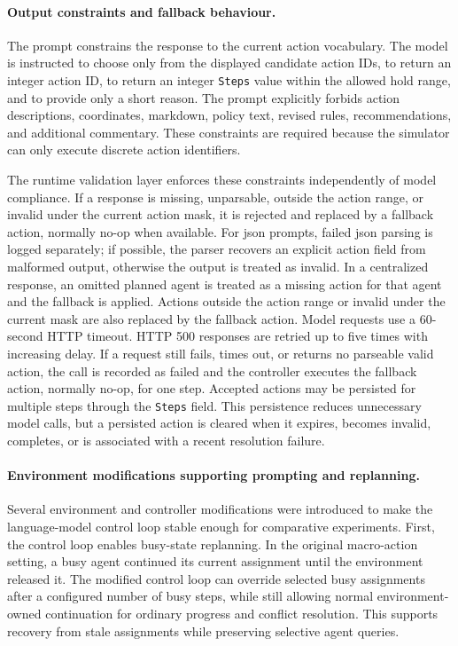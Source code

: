\paragraph{Output constraints and fallback behaviour.}
The prompt constrains the response to the current action vocabulary.
The model is instructed to choose only from the displayed candidate action IDs, to return an integer action ID, to return an integer \texttt{Steps} value within the allowed hold range, and to provide only a short reason.
The prompt explicitly forbids action descriptions, coordinates, markdown, policy text, revised rules, recommendations, and additional commentary.
These constraints are required because the simulator can only execute discrete action identifiers.

The runtime validation layer enforces these constraints independently of model compliance.
If a response is missing, unparsable, outside the action range, or invalid under the current action mask, it is rejected and replaced by a fallback action, normally no-op when available.
For \gls{json} prompts, failed \gls{json} parsing is logged separately; if possible, the parser recovers an explicit action field from malformed output, otherwise the output is treated as invalid.
In a centralized response, an omitted planned agent is treated as a missing action for that agent and the fallback is applied. Actions outside the action range or invalid under the current mask are also replaced by the fallback action.
Model requests use a 60-second HTTP timeout. HTTP 500 responses are retried up to five times with increasing delay. If a request still fails, times out, or returns no parseable valid action, the call is recorded as failed and the controller executes the fallback action, normally no-op, for one step.
Accepted actions may be persisted for multiple steps through the \texttt{Steps} field.
This persistence reduces unnecessary model calls, but a persisted action is cleared when it expires, becomes invalid, completes, or is associated with a recent resolution failure.

\paragraph{Environment modifications supporting prompting and replanning.}
Several environment and controller modifications were introduced to make the language-model control loop stable enough for comparative experiments.
First, the control loop enables busy-state replanning.
In the original macro-action setting, a busy agent continued its current assignment until the environment released it.
The modified control loop can override selected busy assignments after a configured number of busy steps, while still allowing normal environment-owned continuation for ordinary progress and conflict resolution.
This supports recovery from stale assignments while preserving selective agent queries.

